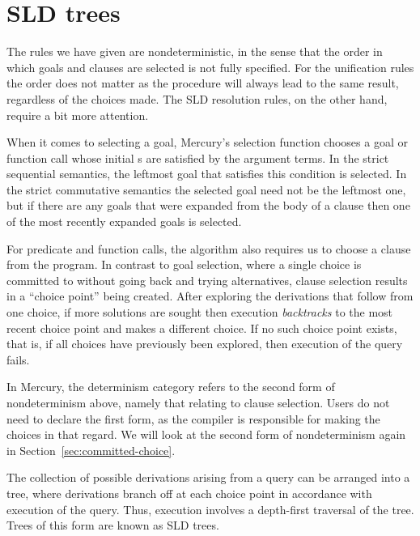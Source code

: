 \section{SLD trees}
\label{sec:sld-trees}

The rules we have given are nondeterministic,
in the sense that
the order in which goals and clauses are selected
is not fully specified.
For the unification rules the order does not matter
as the procedure will always lead to the same result,
regardless of the choices made.
The SLD resolution rules, on the other hand,
require a bit more attention.

When it comes to selecting a goal,
Mercury's selection function chooses a goal or function call
whose initial s
are satisfied by the argument terms.
In the strict sequential semantics,
the leftmost goal that satisfies this condition is selected.
In the strict commutative semantics
the selected goal need not be the leftmost one,
but if there are any goals
that were expanded from the body of a clause
then one of the most recently expanded goals is selected.

For predicate and function calls,
the algorithm also requires us to choose a clause from the program.
In contrast to goal selection,
where a single choice is committed to
without going back and trying alternatives,
clause selection results in a ``choice point\label{gi:choice-point}''
being created.
After exploring the derivations that follow from one choice,
if more solutions are sought then
execution \emph{backtracks\label{gi:backtrack}}
to the most recent choice point
and makes a different choice.
If no such choice point exists,
that is, if all choices have previously been explored,
then execution of the query fails.

In Mercury,
the  determinism category
refers to the second form of nondeterminism above,
namely that relating to clause selection.
Users do not need to declare the first form,
as the compiler is responsible for making the choices in that regard.
We will look at the second form of nondeterminism again
in Section~\ref{sec:committed-choice}.

The collection of possible derivations arising from a query
can be arranged into a tree,
where derivations branch off at each choice point
in accordance with execution of the query.
Thus, execution involves a depth-first traversal of the tree.
Trees of this form are known as SLD trees\label{gi:sld-tree}.

